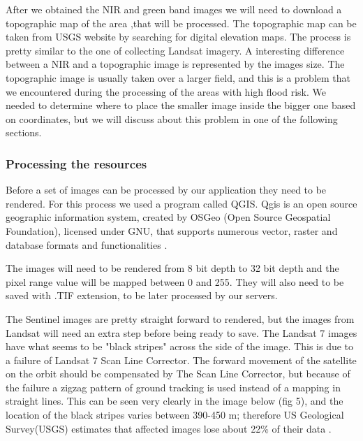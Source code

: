 \documentclass[12pt, a4paper]{report}
\begin{document}
After we obtained the NIR and green band images we will need to download a topographic map of the area ,that will be processed. The topographic map can be taken from USGS website by searching for digital elevation maps. The process is pretty similar to the one of collecting Landsat imagery. A interesting difference between a NIR and a topographic image is represented by the images size. The topographic image is usually taken over a larger field, and this is a problem that we encountered during the processing of the areas with high flood risk. We needed to determine where to place the smaller image inside the bigger one based on coordinates, but we will discuss about this problem in one of the following sections.
\par

\subsubsection{Processing the resources}

\quad
Before a set of images can be processed by our application they need to be rendered. For this process we used a program called QGIS. Qgis is an open source geographic information system, created by OSGeo (Open Source Geospatial Foundation), licensed under GNU, that supports numerous vector, raster and database formats and functionalities \cite{QGIS}.
\par 

The images will need to be rendered from 8 bit depth to 32 bit depth and the pixel range value will be mapped between 0 and 255. They will also need to be saved with .TIF extension, to be later processed by our servers.
\par 

The Sentinel images are pretty straight forward to rendered, but the images from Landsat will need an extra step before being ready to save. The Landsat 7 images have what seems to be "black stripes" across the side of the image. This is due to a failure of Landsat 7 Scan Line Corrector. The forward movement of the satellite on the orbit should be compensated by The Scan Line Corrector, but because of the failure a zigzag pattern of ground tracking is used instead of a mapping in straight lines. This can be seen very clearly in the image below (fig 5), and the location of the black stripes varies between 390-450 m; therefore US Geological Survey(USGS) estimates that affected images lose about 22\% of their data \cite{Landsat-error}.

\bigskip
\end{document}
